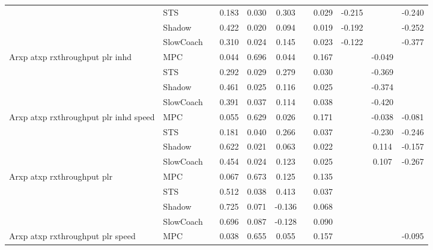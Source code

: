 \begin{tabular}{|l|l|*{9}{c|}}
                              & STS &       &     0.183 &     0.030 &  0.303 &     &  0.029 &  -0.215 &      &   -0.240 \\
                              & Shadow &       &     0.422 &     0.020 &  0.094 &     &  0.019 &  -0.192 &      &   -0.252 \\
                              & SlowCoach &       &     0.310 &     0.024 &  0.145 &     &  0.023 &  -0.122 &      &   -0.377 \\
\midrule
Arxp atxp rxthroughput plr inhd    & MPC &       &     0.044 &     0.696 &  0.044 &     &  0.167 &      &  -0.049 &       \\
                              & STS &       &     0.292 &     0.029 &  0.279 &     &  0.030 &      &  -0.369 &       \\
                              & Shadow &       &     0.461 &     0.025 &  0.116 &     &  0.025 &      &  -0.374 &       \\
                              & SlowCoach &       &     0.391 &     0.037 &  0.114 &     &  0.038 &      &  -0.420 &       \\
\midrule
Arxp atxp rxthroughput plr inhd speed    & MPC &       &     0.055 &     0.629 &  0.026 &     &  0.171 &      &  -0.038 &   -0.081 \\
                              & STS &       &     0.181 &     0.040 &  0.266 &     &  0.037 &      &  -0.230 &   -0.246 \\
                              & Shadow &       &     0.622 &     0.021 &  0.063 &     &  0.022 &      &   0.114 &   -0.157 \\
                              & SlowCoach &       &     0.454 &     0.024 &  0.123 &     &  0.025 &      &   0.107 &   -0.267 \\
\midrule
Arxp atxp rxthroughput plr    & MPC &       &     0.067 &     0.673 &  0.125 &     &  0.135 &      &      &       \\
                              & STS &       &     0.512 &     0.038 &  0.413 &     &  0.037 &      &      &       \\
                              & Shadow &       &     0.725 &     0.071 & -0.136 &     &  0.068 &      &      &       \\
                              & SlowCoach &       &     0.696 &     0.087 & -0.128 &     &  0.090 &      &      &       \\
\midrule
Arxp atxp rxthroughput plr speed    & MPC &       &     0.038 &     0.655 &  0.055 &     &  0.157 &      &      &   -0.095 \\

\end{tabular}
